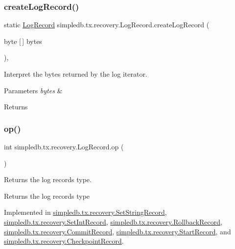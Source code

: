 \subsubsection{\texorpdfstring{create\+Log\+Record()}{createLogRecord()}}
{\footnotesize\ttfamily static \hyperlink{interfacesimpledb_1_1tx_1_1recovery_1_1LogRecord}{Log\+Record} simpledb.\+tx.\+recovery.\+Log\+Record.\+create\+Log\+Record (\begin{DoxyParamCaption}\item[{byte \mbox{[}$\,$\mbox{]}}]{bytes }\end{DoxyParamCaption})\hspace{0.3cm}{\ttfamily [inline]}, {\ttfamily [static]}}

Interpret the bytes returned by the log iterator. 
\begin{DoxyParams}{Parameters}
{\em bytes} & \\
\hline
\end{DoxyParams}
\begin{DoxyReturn}{Returns}

\end{DoxyReturn}
\mbox{\label{interfacesimpledb_1_1tx_1_1recovery_1_1LogRecord_aa97a8907de4709c2b3596e8c9709a26c}} 
\subsubsection{\texorpdfstring{op()}{op()}}
{\footnotesize\ttfamily int simpledb.\+tx.\+recovery.\+Log\+Record.\+op (\begin{DoxyParamCaption}{ }\end{DoxyParamCaption})}

Returns the log record\textquotesingle{}s type. \begin{DoxyReturn}{Returns}
the log record\textquotesingle{}s type 
\end{DoxyReturn}


Implemented in \hyperlink{classsimpledb_1_1tx_1_1recovery_1_1SetStringRecord_a87005ca427089666bd5d1c96ce4fa29d}{simpledb.\+tx.\+recovery.\+Set\+String\+Record}, \hyperlink{classsimpledb_1_1tx_1_1recovery_1_1SetIntRecord_a8e244e4c544a8253c802931f463c139d}{simpledb.\+tx.\+recovery.\+Set\+Int\+Record}, \hyperlink{classsimpledb_1_1tx_1_1recovery_1_1RollbackRecord_a4131d5dbb07f84058bd9551d023ff34b}{simpledb.\+tx.\+recovery.\+Rollback\+Record}, \hyperlink{classsimpledb_1_1tx_1_1recovery_1_1CommitRecord_a4a550ab6247f33e349b3edff767bc630}{simpledb.\+tx.\+recovery.\+Commit\+Record}, \hyperlink{classsimpledb_1_1tx_1_1recovery_1_1StartRecord_a528df40fb41199ed19510524aa0a8044}{simpledb.\+tx.\+recovery.\+Start\+Record}, and \hyperlink{classsimpledb_1_1tx_1_1recovery_1_1CheckpointRecord_add91e88d6b4eb9ed6cfff2d8d8cc021f}{simpledb.\+tx.\+recovery.\+Checkpoint\+Record}.

